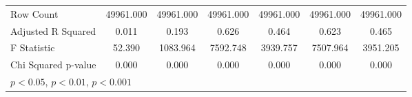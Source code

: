 \begin{table}[htbp]
\begin{tabular}{l*{6}{c}}
\hline
Row Count           &   49961.000         &   49961.000         &   49961.000         &   49961.000         &   49961.000         &   49961.000         \\
Adjusted R Squared  &       0.011         &       0.193         &       0.626         &       0.464         &       0.623         &       0.465         \\
F Statistic         &      52.390         &    1083.964         &    7592.748         &    3939.757         &    7507.964         &    3951.205         \\
Chi Squared p-value &       0.000         &       0.000         &       0.000         &       0.000         &       0.000         &       0.000         \\
\hline\hline
\multicolumn{7}{l}{\footnotesize \sym{*} \(p<0.05\), \sym{**} \(p<0.01\), \sym{***} \(p<0.001\)}\\
\end{tabular}
\end{table}
